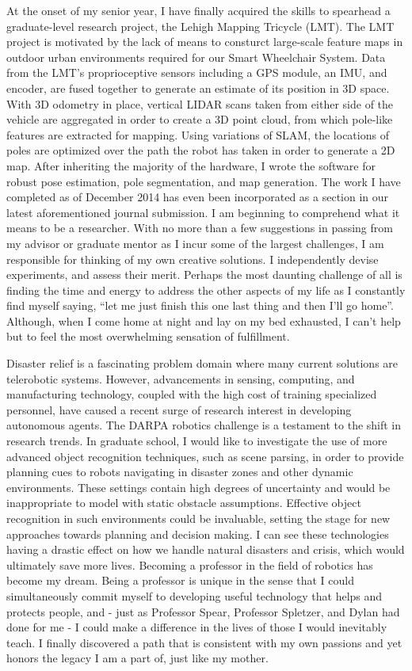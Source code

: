 \documentclass[12pt]{article}
\begin{document}
At the onset of my senior year, I have finally acquired the skills to spearhead
a graduate-level research project, the Lehigh Mapping Tricycle (LMT). The LMT
project is motivated by the lack of means to consturct large-scale feature maps
in outdoor urban environments required for our Smart Wheelchair System.  Data
from the LMT's proprioceptive sensors including a GPS module, an IMU, and
encoder, are fused together to generate an estimate of its position in 3D
space. With 3D odometry in place, vertical LIDAR scans taken from either side
of the vehicle are aggregated in order to create a 3D point cloud, from which
pole-like features are extracted for mapping. Using variations of SLAM, the
locations of poles are optimized over the path the robot has taken in order to
generate a 2D map.  After inheriting the majority of the hardware, I wrote the
software for robust pose estimation, pole segmentation, and map generation. The
work I have completed as of December 2014 has even been incorporated as a
section in our latest aforementioned journal submission. I am beginning to
comprehend what it means to be a researcher. With no more than a few
suggestions in passing from my advisor or graduate mentor as I incur some of
the largest challenges, I am responsible for thinking of my own creative
solutions. I independently devise experiments, and assess their merit.  Perhaps
the most daunting challenge of all is finding the time  and energy to address
the other aspects of my life as I constantly find myself saying, ``let me just
finish this one last thing and then I'll go home''. Although, when I come home
at night and lay on my bed exhausted, I can't help but to feel the most
overwhelming sensation of fulfillment.

Disaster relief is a fascinating problem domain where many current solutions
are telerobotic systems. However, advancements in sensing, computing, and
manufacturing technology, coupled with the high cost of training specialized
personnel, have caused a recent surge of research interest in developing
autonomous agents. The DARPA robotics challenge is a testament to the shift in
research trends. In graduate school, I would like to investigate the use of
more advanced object recognition techniques, such as scene parsing, in order to
provide planning cues to robots navigating in disaster zones and other dynamic
environments.  These settings contain high degrees of uncertainty and would be
inappropriate to model with static obstacle assumptions. Effective object
recognition in such environments could be invaluable, setting the stage for new
approaches towards planning and decision making. I can see these technologies
having a drastic effect on how we handle natural disasters and crisis, which
would ultimately save more lives. Becoming a professor in the field of robotics
has become my dream. Being a professor is unique in the sense that I could
simultaneously commit myself to developing useful technology that helps and
protects people, and - just as Professor Spear, Professor Spletzer, and Dylan
had done for me - I could make a difference in the lives of those I would
inevitably teach. I finally discovered a path that is consistent with my own
passions and yet honors the legacy I am a part of, just like my mother.
\end{document}
